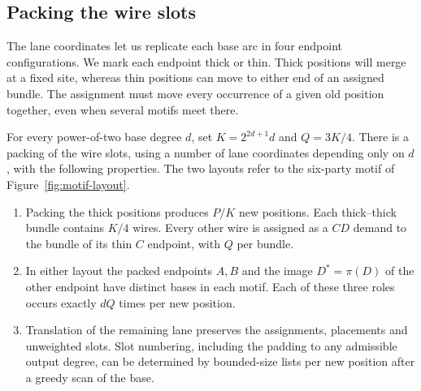 \subsection{Packing the wire slots}\label{sec:compressor-slots}

The lane coordinates let us replicate each base arc in four endpoint
configurations. We mark each endpoint thick or thin. Thick positions
will merge at a fixed site, whereas thin positions can move to either
end of an assigned bundle. The assignment must move every occurrence
of a given old position together, even when several motifs meet there.

\begin{lemma}\label{lem:compressor-slots}
For every power-of-two base degree $d$, set $K=2^{2d+1}d$ and $Q=3K/4$.
There is a packing of the wire slots, using a number of lane coordinates
depending only on $d$, with the following properties. The two layouts
refer to the six-party motif of Figure~\ref{fig:motif-layout}.
\begin{enumerate}
\item Packing the thick positions produces $P/K$ new positions. Each
thick--thick bundle contains $K/4$ wires. Every other wire is assigned as
a $CD$ demand to the bundle of its thin $C$ endpoint, with $Q$ per bundle.
\item In either layout the packed endpoints $A,B$ and the image $D^*=\pi(D)$
of the other endpoint have distinct bases in each motif. Each of these three
roles occurs exactly $dQ$ times per new position.
\item Translation of the remaining lane preserves the assignments, placements
and unweighted slots. Slot numbering, including the padding
to any admissible output degree, can be determined by bounded-size lists
per new position after a greedy scan of the base.
\end{enumerate}
\end{lemma}

